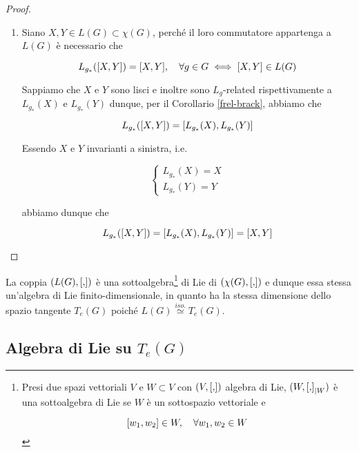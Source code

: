\begin{proof}
\begin{enumerate}
		\item Siano $ X,Y \in L(G) \subset \chi(G) $, perché il loro commutatore appartenga a $ L(G) $ è necessario che
		
		\begin{equation}
			L_{g_{*}}(\comm{X}{Y}) = \comm{X}{Y} \qcomma \forall g \in G \iff \comm{X}{Y} \in L(G)
		\end{equation}
	
		Sappiamo che $ X $ e $ Y $ sono lisci e inoltre sono $ L_{g} $-related rispettivamente a $ L_{g_{*}}(X) $ e $ L_{g_{*}}(Y) $ dunque, per il Corollario \ref{frel-brack}, abbiamo che
		
		\begin{equation}
			L_{g_{*}}(\comm{X}{Y}) = \comm{L_{g_{*}}(X)}{L_{g_{*}}(Y)}
		\end{equation}
	
		Essendo $ X $ e $ Y $ invarianti a sinistra, i.e.
		
		\begin{equation}
			\begin{cases}
				L_{g_{*}}(X) = X\\
				L_{g_{*}}(Y) = Y
			\end{cases}
		\end{equation}
		
		abbiamo dunque che
		
		\begin{equation}
			L_{g_{*}}(\comm{X}{Y}) = \comm{L_{g_{*}}(X)}{L_{g_{*}}(Y)} = \comm{X}{Y}
		\end{equation}		
	\end{enumerate}
\end{proof}

\begin{corollary}
	La coppia $ (L(G),\comm{}{}) $ è una sottoalgebra\footnote{%
		Presi due spazi vettoriali $ V $ e $ W \subset V $ con $ (V,\comm{}{}) $ algebra di Lie, $ (W,\comm{}{}_{| W}) $ è una sottoalgebra di Lie se $ W $ è un sottospazio vettoriale e
		
		\begin{equation}
			\comm{w_{1}}{w_{2}} \in W \qcomma \forall w_{1},w_{2} \in W
		\end{equation}%
	} di Lie di $ (\chi(G),\comm{}{}) $ e dunque essa stessa un'algebra di Lie finito-dimensionale, in quanto ha la stessa dimensione dello spazio tangente $ T_{e}(G) $ poiché $ L(G) \stackrel{iso.}{\simeq} T_{e}(G) $.
\end{corollary}

\subsection{Algebra di Lie su $ T_{e}(G) $}

